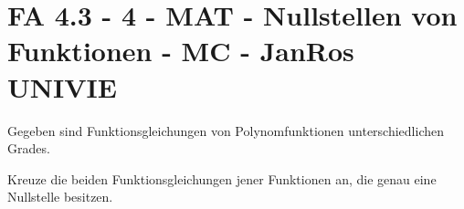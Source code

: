 \section{FA 4.3 - 4 - MAT - Nullstellen von Funktionen - MC - JanRos UNIVIE}

\begin{beispiel}[FA 4.3]{1} %
Gegeben sind Funktionsgleichungen von Polynomfunktionen unterschiedlichen Grades.

Kreuze die beiden Funktionsgleichungen jener  Funktionen an, die genau eine Nullstelle besitzen.\vspace{0,3cm}


\end{beispiel}